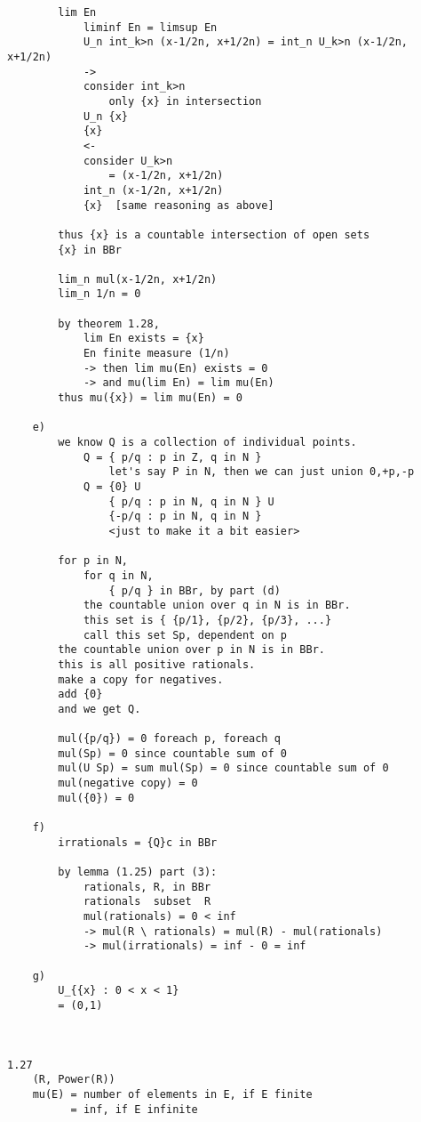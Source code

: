 \documentclass{article}
\begin{document}
\begin{flushleft}
\begin{verbatim}
        lim En 
            liminf En = limsup En 
            U_n int_k>n (x-1/2n, x+1/2n) = int_n U_k>n (x-1/2n, x+1/2n)
            ->
            consider int_k>n 
                only {x} in intersection 
            U_n {x}
            {x}
            <-
            consider U_k>n 
                = (x-1/2n, x+1/2n)
            int_n (x-1/2n, x+1/2n)
            {x}  [same reasoning as above]
            
        thus {x} is a countable intersection of open sets
        {x} in BBr 

        lim_n mul(x-1/2n, x+1/2n)
        lim_n 1/n = 0

        by theorem 1.28, 
            lim En exists = {x}
            En finite measure (1/n)
            -> then lim mu(En) exists = 0 
            -> and mu(lim En) = lim mu(En)
        thus mu({x}) = lim mu(En) = 0             
        
    e)
        we know Q is a collection of individual points. 
            Q = { p/q : p in Z, q in N }
                let's say P in N, then we can just union 0,+p,-p
            Q = {0} U 
                { p/q : p in N, q in N } U 
                {-p/q : p in N, q in N }
                <just to make it a bit easier>
        
        for p in N, 
            for q in N,
                { p/q } in BBr, by part (d)
            the countable union over q in N is in BBr.
            this set is { {p/1}, {p/2}, {p/3}, ...}
            call this set Sp, dependent on p 
        the countable union over p in N is in BBr. 
        this is all positive rationals. 
        make a copy for negatives. 
        add {0}
        and we get Q. 

        mul({p/q}) = 0 foreach p, foreach q 
        mul(Sp) = 0 since countable sum of 0 
        mul(U Sp) = sum mul(Sp) = 0 since countable sum of 0 
        mul(negative copy) = 0 
        mul({0}) = 0

    f)
        irrationals = {Q}c in BBr 

        by lemma (1.25) part (3):
            rationals, R, in BBr 
            rationals  subset  R
            mul(rationals) = 0 < inf 
            -> mul(R \ rationals) = mul(R) - mul(rationals)
            -> mul(irrationals) = inf - 0 = inf
            
    g)
        U_{{x} : 0 < x < 1}
        = (0,1)
        


1.27
    (R, Power(R))
    mu(E) = number of elements in E, if E finite 
          = inf, if E infinite 


\end{verbatim}
\end{flushleft}
\end{document}
